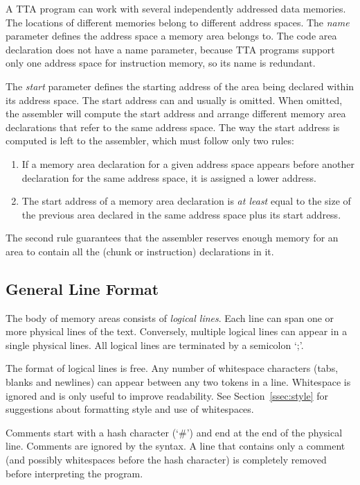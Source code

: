 \documentclass[twoside]{tceusermanual}
\begin{document}
A TTA program can work with several independently addressed data memories.
The locations of different memories belong to different address spaces. The
\emph{name} parameter defines the address space a memory area belongs
to. The code area declaration does not have a name parameter, because TTA
programs support only one address space for instruction memory, so its name
is redundant.

The \emph{start} parameter defines the starting address of the area being
declared within its address space. The start address can and usually is
omitted. When omitted, the assembler will compute the start address and
arrange different memory area declarations that refer to the same address
space. The way the start address is computed is left to the assembler, which
must follow only two rules:

\begin{enumerate}
\item %
  If a memory area declaration for a given address space appears before
  another declaration for the same address space, it is assigned a lower
  address.
\item %
  The start address of a memory area declaration is \emph{at least} equal to
  the size of the previous area declared in the same address space plus its
  start address.
\end{enumerate}

The second rule guarantees that the assembler reserves enough memory for an
area to contain all the (chunk or instruction) declarations in it.

\subsection{General Line Format}
\label{ssec:lines}

The body of memory areas consists of \emph{logical lines}.  Each line can
span one or more physical lines of the text. Conversely, multiple logical
lines can appear in a single physical lines.  All logical lines are
terminated by a semicolon `;'.

The format of logical lines is free. Any number of whitespace characters
(tabs, blanks and newlines) can appear between any two tokens in a line.
Whitespace is ignored and is only useful to improve readability. See
Section~\ref{ssec:style} for suggestions about formatting style and use of
whitespaces.

Comments start with a hash character (`\#') and end at the end of the
physical line.  Comments are ignored by the syntax.  A line that contains
only a comment (and possibly whitespaces before the hash character) is
completely removed before interpreting the program.
\end{document}
